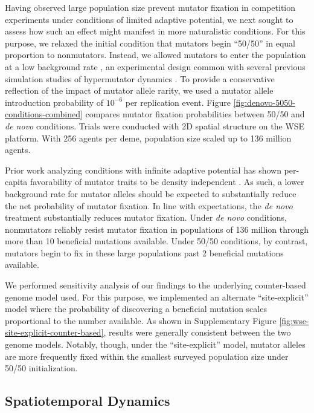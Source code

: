 

Having observed large population size prevent mutator fixation in competition experiments under conditions of limited adaptive potential, we next sought to assess how such an effect might manifest in more naturalistic conditions.
For this purpose, we relaxed the initial condition that mutators begin ``50/50'' in equal proportion to nonmutators.
Instead, we allowed mutators to enter the population at a low background rate \citep{desai2011balance,johnson1999approach}, an experimental design common with several previous simulation studies of hypermutator dynamics \citep{wylie2009fixation,tenaillon1999mutators}.
To provide a conservative reflection of the impact of mutator allele rarity, we used a mutator allele introduction probability of $10^{-6}$ per replication event.
Figure \ref{fig:denovo-5050-conditions-combined} compares mutator fixation probabilities between 50/50 and \textit{de novo} conditions.
Trials were conducted with 2D spatial structure on the WSE platform.
With 256 agents per deme, population size scaled up to 136 million agents.

Prior work analyzing conditions with infinite adaptive potential has shown per-capita favorability of mutator traits to be density independent \citep{raynes2019selection}.
As such, a lower background rate for mutator alleles should be expected to substantially reduce the net probability of mutator fixation.
In line with expectations, the \textit{de novo} treatment substantially reduces mutator fixation.
Under \textit{de novo} conditions, nonmutators reliably resist mutator fixation in populations of 136 million through more than 10 beneficial mutations available.
Under 50/50 conditions, by contrast, mutators begin to fix in these large populations past 2 beneficial mutations available.

We performed sensitivity analysis of our findings to the underlying counter-based genome model used.
For this purpose, we implemented an alternate ``site-explicit'' model where the probability of discovering a beneficial mutation scales proportional to the number available.
As shown in Supplementary Figure \ref{fig:wse-site-explicit-counter-based}, results were generally consistent between the two genome models.
Notably, though, under the ``site-explicit'' model, mutator alleles are more frequently fixed within the smallest surveyed population size under 50/50 initialization.

\subsection{Spatiotemporal Dynamics}
\label{sec:dynamics}

